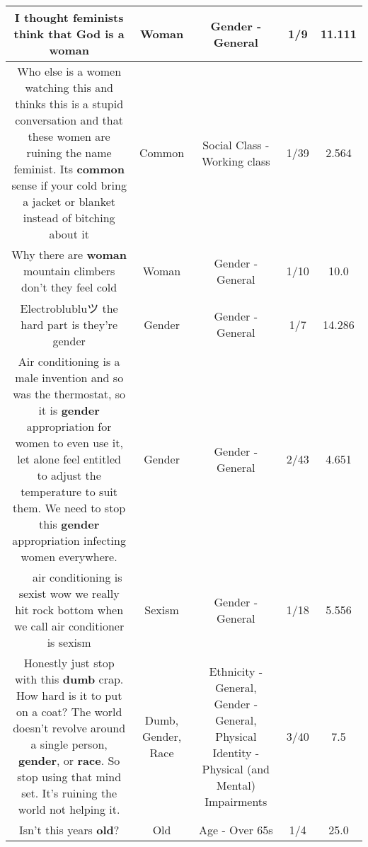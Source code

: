 \documentclass[11pt]{article}
\newlength\mylength
\begin{document}
\begin{center}
\begin{longtable}{|C{.65\mylength}|C{.30\mylength}|C{.12\mylength}|C{.12\mylength}|C{.12\mylength}|}
  \small I thought feminists think that God is a woman\normalsize   & Woman & Gender - General & 1/9 & 11.111 \\  \hline
  \small Who else is a women watching this and thinks this is a stupid conversation and that these women are ruining the name feminist. Its \textbf{common} sense if your cold bring a jacket or blanket instead of bitching about it\normalsize   & Common & Social Class - Working class & 1/39 & 2.564 \\  \hline
  \small Why there are \textbf{woman} mountain climbers don't they feel cold\normalsize   & Woman & Gender - General & 1/10 & 10.0 \\  \hline
  \small Electroblubluツ the hard part is they're gender\normalsize   & Gender & Gender - General & 1/7 & 14.286 \\  \hline
  \small Air conditioning is a male invention and so was the thermostat, so it is \textbf{gender} appropriation for women to even use it, let alone feel entitled to adjust the temperature to suit them. We need to stop this \textbf{gender} appropriation infecting women everywhere.\normalsize   & Gender & Gender - General & 2/43 & 4.651 \\  \hline
  \small 👏👏👏👏 air conditioning is sexist  wow we really hit rock bottom when we call air conditioner is sexism\normalsize   & Sexism & Gender - General & 1/18 & 5.556 \\  \hline
  \small Honestly just stop with this \textbf{dumb} crap. How hard is it to put on a coat? The world doesn't revolve around a single person, \textbf{gender}, or \textbf{race}. So stop using that mind set. It's ruining the world not helping it.\normalsize   & Dumb, Gender, Race & Ethnicity - General, Gender - General, Physical Identity - Physical (and Mental) Impairments & 3/40 & 7.5 \\  \hline
  \small Isn't this years \textbf{old}?\normalsize   & Old & Age - Over 65s & 1/4 & 25.0 \\  \hline

\end{longtable}
\end{center}
\end{document}
